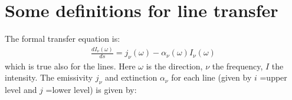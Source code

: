 \documentclass[letterpaper,10pt,english]{sphinxmanual}
\begin{document}
\section{Some definitions for line transfer}
\label{\detokenize{lineradtrans:some-definitions-for-line-transfer}}\label{\detokenize{lineradtrans:sec-line-trans-definitions}}
The formal transfer equation is:
\begin{equation*}
\begin{split}\frac{dI_\nu(\omega)}{ds} = j_\nu(\omega) - \alpha_\nu(\omega)I_\nu(\omega)\end{split}
\end{equation*}
which is true also for the lines. Here \(\omega\) is the direction,
\(\nu\) the frequency, \(I\) the intensity.  The emissivity
\(j_\nu\) and extinction \(\alpha_\nu\) for each line (given by
\(i\) =upper level and \(j\) =lower level) is given by:
\end{document}
